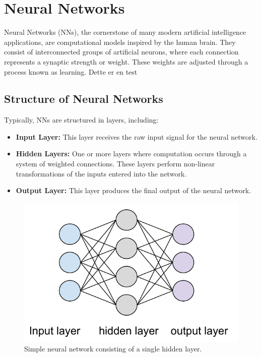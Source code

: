 

\section{Neural Networks}
Neural Networks (NNs), the cornerstone of many modern artificial intelligence applications, are computational models inspired by the human brain. They consist of interconnected groups of artificial neurons, where each connection represents a synaptic strength or weight. These weights are adjusted through a process known as learning.\newline\newline
Dette er en test


\subsection{Structure of Neural Networks}
Typically, NNs are structured in layers, including:
\begin{itemize}
    \item \textbf{Input Layer:} This layer receives the raw input signal for the neural network.
    \item \textbf{Hidden Layers:} One or more layers where computation occurs through a system of weighted connections. These layers perform non-linear transformations of the inputs entered into the network.
    \item \textbf{Output Layer:} This layer produces the final output of the neural network.
\end{itemize}

\begin{figure}[H]
    \includegraphics[scale=0.7]{figures/figure-pdf/NN.pdf}
    \caption{Simple neural network consisting of a single hidden layer.}
\end{figure}

